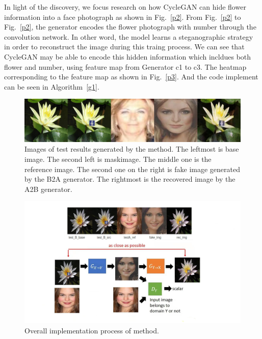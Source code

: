 \documentclass[a4paper]{article}
\begin{document}
	In light of the discovery, we focus research on how CycleGAN can hide flower information into a face photograph as shown in Fig.~\ref{p2}. From Fig.~\ref{p2} to Fig.~\ref{p2}, the generator encodes the flower photograph with number through the convolution network. In other word, the model learns a steganographic strategy in order to reconstruct the image during this traing process. We can see that CycleGAN may be able to encode this hidden information which incldues both flower and number, using feature map from Generator c1 to c3. The heatmap corresponding to the feature map as shown in Fig.~\ref{p3}. And the code implement can be seen in Algorithm~\ref{g1}.
	\begin{figure}
		\begin{center}
			\includegraphics[scale=0.3]{figures/image_00284/BtoA_image_00284.jpg}
		\end{center}
		\caption{Images of test results generated by the method. The leftmost is base image. The second left is maskimage. The middle one is the reference image. The second one on the right is fake image generated by the B2A generator. The rightmost is the recovered image by the A2B generator.}
		\label{p1}
	\end{figure} 
	
		\begin{figure}
			\begin{center}
				\includegraphics[scale=0.3]{figures/encripgan.jpg}
			\end{center}
			\caption{Overall implementation process of method.}
			\label{p9}
		\end{figure} 
	
\end{document}
